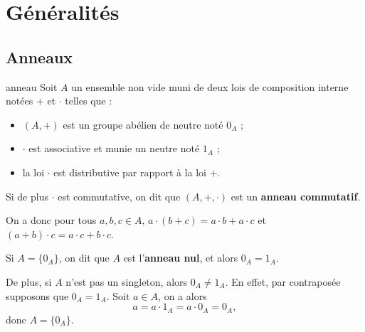 \section{Généralités}
\subsection{Anneaux}

\begin{definition}{anneau}{}
    Soit $A$ un ensemble non vide muni de deux lois de composition interne notées $+$ et
    $\cdot$ telles que : 
    \begin{itemize}
        \item $(A, +)$ est un groupe abélien de neutre noté $0_A$ ;
        \item $\cdot$ est associative et munie un neutre noté $1_A$ ;
        \item la loi $\cdot$ est distributive par rapport à la loi $+$.
    \end{itemize}
    Si de plus $\cdot$ est commutative, on dit que $(A, +, \cdot)$ est un \textbf{anneau commutatif}.
\end{definition}

\begin{remarque}
    On a donc pour tous $a, b, c \in A$, $a \cdot (b + c) = a \cdot b + a \cdot c$ et 
    $(a + b) \cdot c = a \cdot c + b \cdot c$.
\end{remarque}

\begin{remarque}
    Si $A = \{0_A\}$, on dit que $A$ est l'\textbf{anneau nul}, et 
    alors $0_A = 1_A$.

    De plus, si $A$ n'est pas un singleton, alors $0_A \neq 1_A$. En effet, 
    par contraposée supposons que $0_A = 1_A$. Soit $a \in A$, on a alors 
    \[
        a = a \cdot 1_A = a \cdot 0_A = 0_A,
    \]
    donc $A = \{0_A\}$.
\end{remarque}

